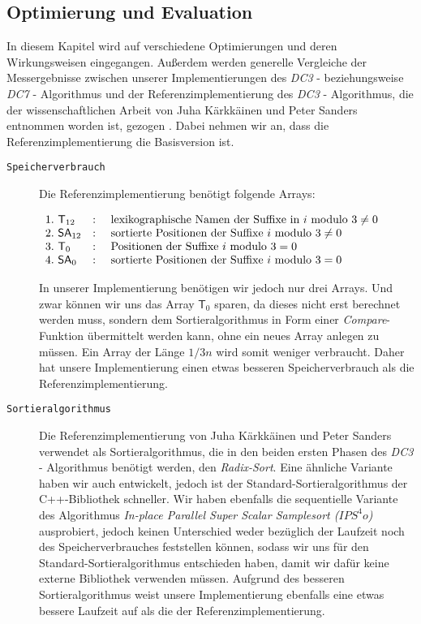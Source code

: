 \subsection{Optimierung und Evaluation}
\label{dc3:optim}

In  diesem Kapitel wird auf verschiedene Optimierungen und deren Wir\-kungs\-wei\-sen eingegangen. Außerdem werden generelle Vergleiche der Mess\-er\-geb\-nis\-se zwischen unserer Implementierungen des \emph{DC3} - beziehungsweise \emph{DC7} - Algorithmus und der Referenzimplementierung des \emph{DC3} - Algorithmus, die der wissenschaftlichen Arbeit von Juha Kärkkäinen und Peter Sanders entnommen worden ist, gezogen \cite[p.~954,955]{saca:9}. Dabei nehmen wir an, dass die Referenzimplementierung die Basisversion ist.

\begin{description}
	\item[\texttt{Speicherverbrauch}]

	Die Referenzimplementierung benötigt folgende Arrays:

	$\begin{array}{lcl}
	1. \text{  } \mathsf{T}_{12} & : & \text{ lexikographische Namen der Suffixe in } 	i \text{ modulo } 3 \neq 0\\
	2. \text{  } \sa_{12}& : & \text{ sortierte Positionen der Suffixe } 		i \text{ modulo } 3 \neq 0\\
	3. \text{  } \mathsf{T}_0	& : & \text{ Positionen der Suffixe } 					i \text{ modulo } 3 = 0\\
	4. \text{  } \sa_0	& : & \text{ sortierte Positionen der Suffixe } 		i \text{ modulo } 3 = 0
	\end{array}$

	In unserer Implementierung benötigen wir jedoch nur drei Arrays. Und zwar können wir uns das Array $\mathsf{T}_{0}$ sparen, da dieses nicht erst berechnet werden muss, sondern dem Sortieralgorithmus in Form einer \emph{Compare}-Funktion übermittelt werden kann, ohne ein neues Array anlegen zu müssen. Ein Array der Länge $1/3n$ wird somit weniger verbraucht. Daher hat unsere Implementierung einen etwas besseren Speicherverbrauch als die Referenzimplementierung.

	\item[\texttt{Sortieralgorithmus}]

	Die Referenzimplementierung von Juha Kärkkäinen und Peter Sanders verwendet als Sortieralgorithmus, die in den beiden ersten Phasen des \emph{DC3} - Algorithmus benötigt werden, den \emph{Radix-Sort}. Eine ähnliche Variante haben wir auch entwickelt, jedoch ist der Standard-Sortieralgorithmus der C++-Bibliothek schneller. Wir haben ebenfalls die sequentielle Variante des Algorithmus \emph{In-place Parallel Super Scalar Samplesort ($IPS^4o$)} ausprobiert, jedoch keinen Unterschied weder bezüglich der Laufzeit noch des Speicherverbrauches feststellen können, sodass wir uns für den Standard-Sortieralgorithmus entschieden haben, damit wir dafür keine externe Bibliothek verwenden müssen. Aufgrund des besseren Sortieralgorithmus weist unsere Implementierung ebenfalls eine etwas bessere Laufzeit auf als die der Referenzimplementierung.


\end{description}
